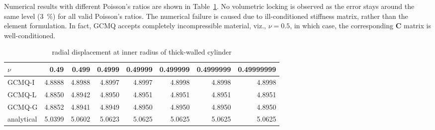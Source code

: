 \documentclass[3p,sort&compress,review,11pt]{elsarticle}
\newcommand*{\tabref}[1]{Table~\ref{#1}}
\newcommand*{\mb}{\bm}
\begin{document}
Numerical results with different Poisson's ratios are shown in \tabref{tab:cylinder}. No volumetric locking is observed as the error stays around the same level (\SI{3}{\percent}) for all valid Poisson's ratios. The numerical failure is caused due to ill-conditioned stiffness matrix, rather than the element formulation. In fact, GCMQ accepts completely incompressible material, viz., $\nu=0.5$, in which case, the corresponding $\mb{C}$ matrix is well-conditioned.
\begin{table}[htb]
\centering\footnotesize
\caption{radial displacement at inner radius of thick-walled cylinder}\label{tab:cylinder}
\begin{tabular}{lrrrrrrr}
	\toprule
	$\nu$      &   0.49 &  0.499 & 0.4999 & 0.49999 & 0.499999 & 0.4999999 & 0.49999999 \\ \midrule
	GCMQ-I     & 4.8888 & 4.8988 & 4.8997 &  4.8997 &   4.8998 &    4.8998 &     4.8998 \\
	GCMQ-L     & 4.8850 & 4.8942 & 4.8950 &  4.8951 &   4.8951 &    4.8951 &     4.8951 \\
	GCMQ-G     & 4.8852 & 4.8941 & 4.8949 &  4.8950 &   4.8950 &    4.8950 &     4.8950 \\
	analytical & 5.0399 & 5.0602 & 5.0623 &  5.0625 &   5.0625 &    5.0625 &     5.0625 \\ \bottomrule
\end{tabular}
\end{table}
\end{document}

